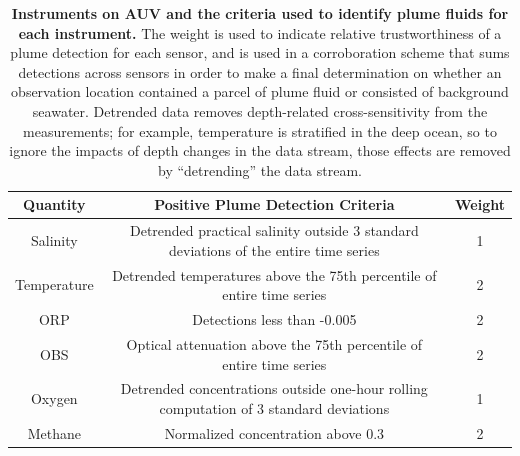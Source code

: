 \begin{table}[h!]
    \centering
    \begin{tabular}{c|c|c}
        Quantity & Positive Plume Detection Criteria & Weight  \\
        \hline
        Salinity & Detrended practical salinity outside 3 standard deviations of the entire time series & 1 \\
        Temperature & Detrended temperatures above the 75th percentile of entire time series & 2 \\
        ORP & Detections less than -0.005 & 2 \\
        OBS & Optical attenuation above the 75th percentile of entire time series & 2 \\
        Oxygen & Detrended concentrations outside one-hour rolling computation of 3 standard deviations & 1 \\
        Methane & Normalized concentration above 0.3 & 2
    \end{tabular}
    \caption{\textbf{Instruments on AUV \Sentry and the criteria used to identify plume fluids for each instrument.} The weight is used to indicate relative trustworthiness of a plume detection for each sensor, and is used in a corroboration scheme that sums detections across sensors in order to make a final determination on whether an observation location contained a parcel of plume fluid or consisted of background seawater. Detrended data removes depth-related cross-sensitivity from the measurements; for example, temperature is stratified in the deep ocean, so to ignore the impacts of depth changes in the data stream, those effects are removed by ``detrending'' the data stream.}
    \label{tab:sentry_instruments}
\end{table}

